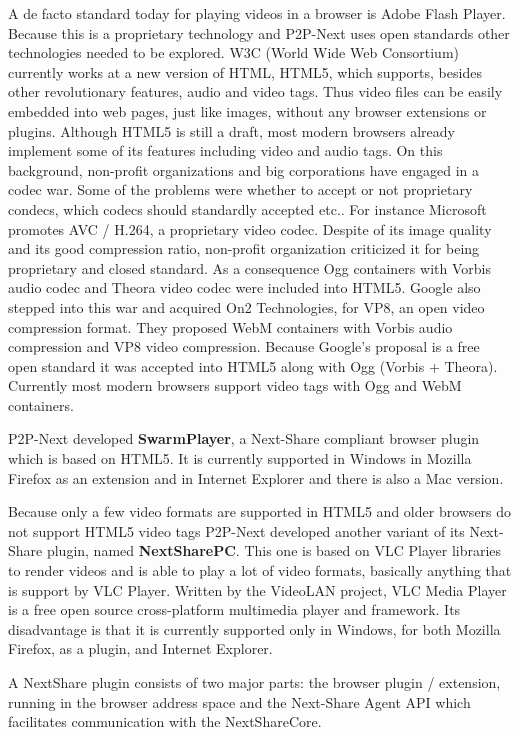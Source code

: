 A de facto standard today for playing videos in a browser is Adobe Flash Player. Because this is a proprietary technology and P2P-Next uses open standards other technologies needed to be explored. W3C (World Wide Web Consortium) currently works at a new version of HTML, HTML5, which supports, besides other revolutionary features, audio and video tags. Thus video files can be easily embedded into web pages, just like images, without any browser extensions or plugins. Although HTML5 is still a draft, most modern browsers already implement some of its features including video and audio tags. On this background, non-profit organizations and big corporations have engaged in a codec war. Some of the problems were whether to accept or not proprietary condecs, which codecs should standardly accepted etc.. For instance Microsoft promotes AVC / H.264, a proprietary video codec. Despite of its image quality and its good compression ratio, non-profit organization criticized it for being proprietary and closed standard. As a consequence Ogg containers with Vorbis audio codec and Theora video codec were included into HTML5. Google also stepped into this war and acquired On2 Technologies, for VP8, an open video compression format. They proposed WebM containers with Vorbis audio compression and VP8 video compression. Because Google's proposal is a free open standard it was accepted into HTML5 along with Ogg (Vorbis + Theora). Currently most modern browsers support video tags with Ogg and WebM containers.

P2P-Next developed \textbf{SwarmPlayer}, a Next-Share compliant browser plugin which is based on HTML5. It is currently supported in Windows in Mozilla Firefox as an extension and in Internet Explorer and there is also a Mac version.

Because only a few video formats are supported in HTML5 and older browsers do not support HTML5 video tags P2P-Next developed another variant of its Next-Share plugin, named \textbf{NextSharePC}. This one is based on VLC Player libraries to render videos and is able to play a lot of video formats, basically anything that is support by VLC Player. Written by the VideoLAN project, VLC Media Player is a free open source cross-platform multimedia player and framework. Its disadvantage is that it is currently supported only in Windows, for both Mozilla Firefox, as a plugin, and Internet Explorer.

A NextShare plugin consists of two major parts: the browser plugin / extension, running in the browser address space and the Next-Share Agent API which facilitates communication with the NextShareCore.